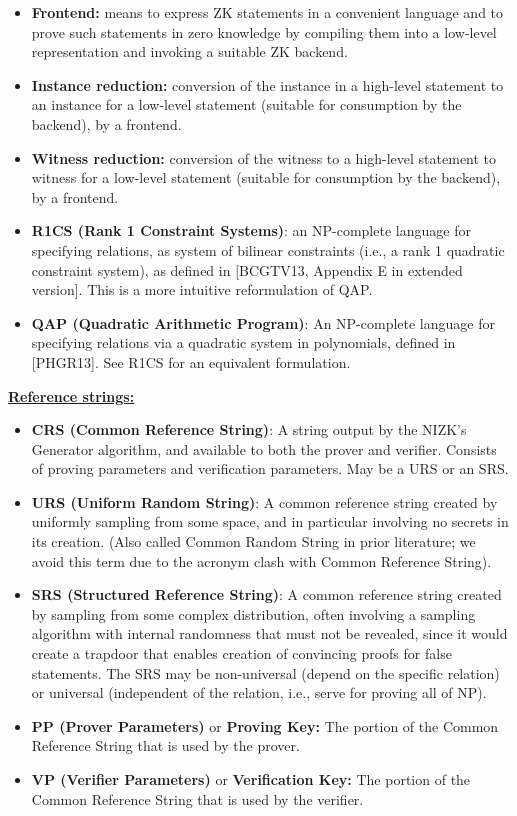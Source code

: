 \begin{itemize}
    \item \textbf{Frontend:} means to express ZK statements in a convenient language and to prove such statements in zero knowledge by compiling them into a low-level representation and invoking a suitable ZK backend.
    \item \textbf{Instance reduction:} conversion of the instance in a high-level statement to an instance for a low-level statement (suitable for consumption by the backend), by a frontend.
    \item \textbf{Witness reduction:} conversion of the witness to a high-level statement to witness for a low-level statement (suitable for consumption by the backend), by a frontend.
    \item \textbf{R1CS (Rank 1 Constraint Systems)}: an NP-complete language for specifying relations, as system of bilinear constraints (i.e., a rank 1 quadratic constraint system), as defined in [BCGTV13, Appendix E in extended version]. This is a more intuitive reformulation of QAP.
    \item \textbf{QAP (Quadratic Arithmetic Program)}: An NP-complete language for specifying relations via a quadratic system in polynomials, defined in [PHGR13]. See R1CS for an equivalent formulation.
		\end{itemize}

\textbf{\underline{Reference strings:}}
\begin{itemize}
    \item \textbf{CRS (Common Reference String)}: A string output by the NIZK’s Generator algorithm, and available to both the prover and verifier. Consists of proving parameters and verification parameters. May be a URS or an SRS.
    \item \textbf{URS (Uniform Random String)}: A common reference string created by uniformly sampling from some space, and in particular involving no secrets in its creation. (Also called Common Random String in prior literature; we avoid this term due to the acronym clash with Common Reference String).
    \item \textbf{SRS (Structured Reference String)}: A common reference string created by sampling from some complex distribution, often involving a sampling algorithm with internal randomness that must not be revealed, since it would create a trapdoor that enables creation of convincing proofs for false statements. The SRS may be non-universal (depend on the specific relation) or universal (independent of the relation, i.e., serve for proving all of NP).
    \item \textbf{PP (Prover Parameters)} or \textbf{Proving Key:} The portion of the Common Reference String that is used by the prover.
    \item \textbf{VP (Verifier  Parameters)} or \textbf{Verification Key:} The portion of the Common Reference String that is used by the verifier.
\end{itemize}
